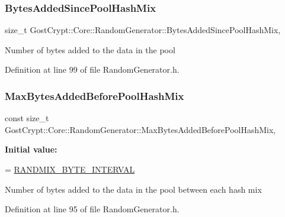 \subsubsection{\texorpdfstring{Bytes\+Added\+Since\+Pool\+Hash\+Mix}{BytesAddedSincePoolHashMix}}
{\footnotesize\ttfamily size\+\_\+t Gost\+Crypt\+::\+Core\+::\+Random\+Generator\+::\+Bytes\+Added\+Since\+Pool\+Hash\+Mix\hspace{0.3cm}{\ttfamily [static]}, {\ttfamily [protected]}}

Number of bytes added to the data in the pool 

Definition at line 99 of file Random\+Generator.\+h.

\mbox{\label{class_gost_crypt_1_1_core_1_1_random_generator_a83367f01390fdfcb9d7305b51bd7072e}} 
\subsubsection{\texorpdfstring{Max\+Bytes\+Added\+Before\+Pool\+Hash\+Mix}{MaxBytesAddedBeforePoolHashMix}}
{\footnotesize\ttfamily const size\+\_\+t Gost\+Crypt\+::\+Core\+::\+Random\+Generator\+::\+Max\+Bytes\+Added\+Before\+Pool\+Hash\+Mix\hspace{0.3cm}{\ttfamily [static]}, {\ttfamily [protected]}}

{\bfseries Initial value\+:}
\begin{DoxyCode}
=
        \hyperlink{_random_8h_a141109cf7b5404e7d60466a3c7b73eef}{RANDMIX\_BYTE\_INTERVAL}
\end{DoxyCode}
Number of bytes added to the data in the pool between each hash mix 

Definition at line 95 of file Random\+Generator.\+h.

\mbox{\label{class_gost_crypt_1_1_core_1_1_random_generator_accde03e05baae45fafe00e4707294e8e}} 

